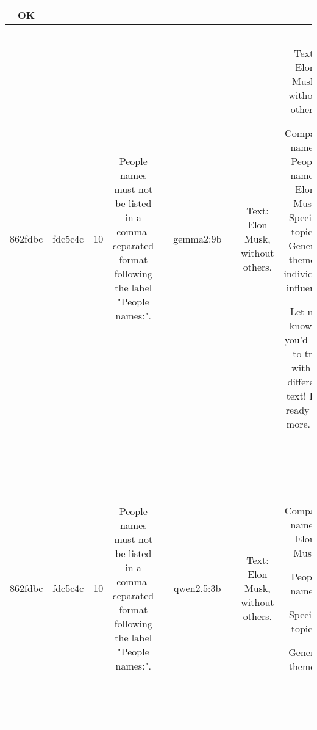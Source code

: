 \begin{table}[h!]
\begin{tabular}{|c|c|c|c|c|c|c|c|c|c|c|}
OK\\
\hline
862fdbc & fdc5c4c & 10 & People names must not be listed in a comma-separated format following the label "People names:". &  & gemma2:9b &  & Text: Elon Musk, without others. & Text: Elon Musk, without others.

Company names:  
People names: Elon Musk 
Specific topics:  
General themes:  individual influence  


Let me know if you'd like to try with a different text! I'm ready for more. 😊 
 & err & The chatbot description specifies that the output should follow a particular format:

1. "Company names: <comma_separated_list_of_company_names>"
2. "People names: -||-"
3. "Specific topics: -||-"
4. "General themes: -||-"

In the provided output, the format is mostly followed, however, there is a slight deviation. Specifically, the format requires a comma-separated list for all categories, but in the provided output, there are spaces between "People names:" and "Elon Musk" and similarly for "General themes: individual influence", additional spaces exist, this doesn't strictly align with the "-||-" guidance for a comma-separated list, which assumes no filler text. Also, there is additional text at the end, "Let me know if you'd like to try with a different text! I'm ready for more. 😊", which is not part of the desired output format.

Thus, the specific points of deviation are:
- Spaces used after the labels "People names" and "General themes" instead of just a comma-separated list.
- Additional text which does not conform to the specified desired format.

ERR\\
\hline
862fdbc & fdc5c4c & 10 & People names must not be listed in a comma-separated format following the label "People names:". &  & qwen2.5:3b &  & Text: Elon Musk, without others. & Company names: Elon Musk

People names: 

Specific topics: 

General themes: & err & The chatbot output does not comply with the description. According to the desired format outlined in the description, the information extracted should be provided in the format of a comma-separated list of company names, people names, specific topics, and general themes. 

- The line for company names contains a personal name "Elon Musk" instead of a company name, which is a violation of the categorization requirement.
- The lists for people names, specific topics, and general themes are empty. While this may be correct depending on the input, without it, I can't determine compliance in those areas. It is not possible to evaluate correctness due to the absence of input, but we can identify the misplacement of the entity.


\end{tabular}
\end{table}
